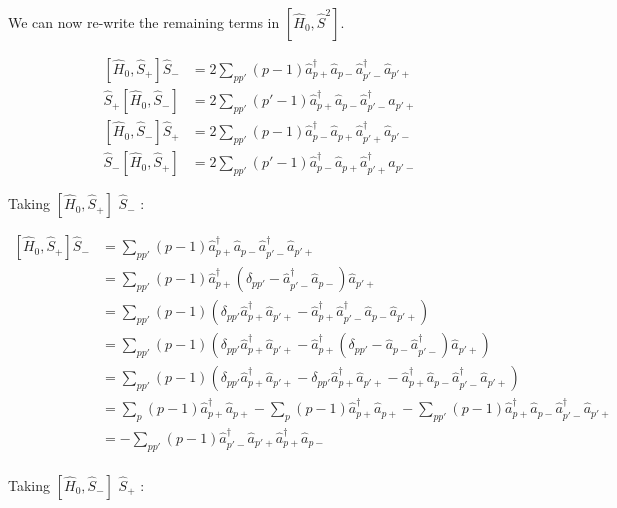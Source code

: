 \documentclass[11pt]{article}
\newcommand{\sop}[1]{%
	\ensuremath{ \hat{S}_{#1} } }
\newcommand{\cop}[2]{%
	\ensuremath{ \hat{a} _{#1 #2} ^{\dagger} }}
\newcommand{\aop}[2]{%
	\ensuremath{ \hat{a} _{#1 #2} }}
\newcommand{\krondelt}[2]{%
	\ensuremath{ \delta _{#1 #2} }}
\newcommand{\hop}{
	\ensuremath{ \hat{H} _0 }}
\newcommand{\commutator}[2]{%
	\ensuremath{ \left [ #1,#2 \right ] }}
\begin{document}
We can now re-write the remaining terms in $ \left [ \hat{H}_0, \hat{S}^2 \right ]$.

\begin{align*}
	\commutator{\hop}{\sop{+}} \sop{-} &= 2 \sum _{pp'} (p-1) \cop{p}{+} \aop{p}{-} \cop{p'}{-} \aop{p'}{+}\\
	\sop{+} \commutator{\hop}{\sop{-}} &= 2 \sum _{pp'} (p'-1) \cop{p}{+} \aop{p}{-} \cop{p'}{-} \aop{p'}{+}\\
	\commutator{\hop}{\sop{-}} \sop{+} &= 2 \sum _{pp'} (p-1) \cop{p}{-} \aop{p}{+} \cop{p'}{+} \aop{p'}{-}\\
	\sop{-} \commutator{\hop}{\sop{+}} &= 2 \sum _{pp'} (p'-1) \cop{p}{-} \aop{p}{+} \cop{p'}{+} \aop{p'}{-}
\end{align*}

Taking \commutator{\hop}{\sop{+}} \sop{-}:

\begin{align*}
	\commutator{\hop}{\sop{+}} \sop{-} &= \sum _{pp'} (p-1) \cop{p}{+} \aop{p}{-} \cop{p'}{-} \aop{p'}{+}\\
	&= \sum _{pp'} (p-1) \cop{p}{+} \left ( \krondelt{p}{p'} -  \cop{p'}{-} \aop{p}{-} \right ) \aop{p'}{+}\\
	&= \sum _{pp'} (p-1) \left ( \krondelt{p}{p'} \cop{p}{+} \aop{p'}{+} -  \cop{p}{+} \cop{p'}{-} \aop{p}{-} \aop{p'}{+} \right )\\
	&= \sum _{pp'} (p-1) \left ( \krondelt{p}{p'} \cop{p}{+} \aop{p'}{+} -  \cop{p}{+} \left ( \krondelt{p}{p'} - \aop{p}{-} \cop{p'}{-} \right ) \aop{p'}{+} \right )\\
	&= \sum _{pp'} (p-1) \left ( \krondelt{p}{p'} \cop{p}{+} \aop{p'}{+} - \krondelt{p}{p'} \cop{p}{+} \aop{p'}{+} - \cop{p}{+} \aop{p}{-} \cop{p'}{-} \aop{p'}{+} \right )\\
	&= \sum _{p} (p-1) \cop{p}{+} \aop{p}{+} - \sum _{p} (p-1) \cop{p}{+} \aop{p}{+} - \sum _{pp'} (p-1) \cop{p}{+} \aop{p}{-} \cop{p'}{-} \aop{p'}{+} \\
&= - \sum _{pp'} (p-1) \cop{p'}{-} \aop{p'}{+} \cop{p}{+} \aop{p}{-}\\
\end{align*}

Taking \commutator{\hop}{\sop{-}} \sop{+}:
\end{document}
